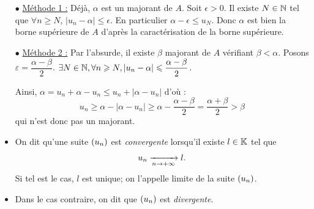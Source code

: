 \documentclass{magnoliaold}
\begin{document}

\begin{sol}
\begin{itemize}
\item[$\bullet$] \underline{Méthode 1 :} Déjà, $\alpha$ est un majorant de $A$. Soit $\epsilon>0$. Il existe $N\in \mathbb{N}$ tel que $\forall n\geq N$, $|u_n-\alpha|\leq \epsilon$. En particulier $\alpha-\epsilon \leq u_N$. Donc $\alpha$ est bien la borne supérieure de $A$ d'après la caractérisation de la borne supérieure.
\item[$\bullet$] \underline{Méthode 2 :} Par l'absurde, il existe $\beta$ majorant de $A$ vérifiant $\beta<\alpha$. Posons $\varepsilon=\dfrac{\alpha-\beta}{2}$. $\exists N \in \mathbb{N}, \forall n\geqslant N, |u_n-\alpha|\leqslant \dfrac{\alpha-\beta}{2}$.

Ainsi, $\alpha=u_n+\alpha-u_n\leq u_n+|\alpha-u_n|$ d'où :
\[u_n\geq \alpha-|\alpha-u_n|\geq \alpha-\dfrac{\alpha-\beta}{2}=\dfrac{\alpha+\beta}{2}>\beta\] qui n'est donc pas un majorant.
\end{itemize}
\end{sol}


\begin{definition}[utile=-3]
\begin{itemize}
\item On dit qu'une suite $\left(u_n\right)$ est \emph{convergente} lorsqu'il existe $l\in\mathbb{K}$
  tel que
  \[u_n\xrightarrow[n\rightarrow +\infty]{} l.\]
  Si tel est le cas, $l$ est unique; on l'appelle limite de la suite $\left(u_n\right)$.
\item Dans le cas contraire, on dit que $\left(u_n\right)$ est \emph{divergente}.
\end{itemize}
\end{definition}
\end{document}
